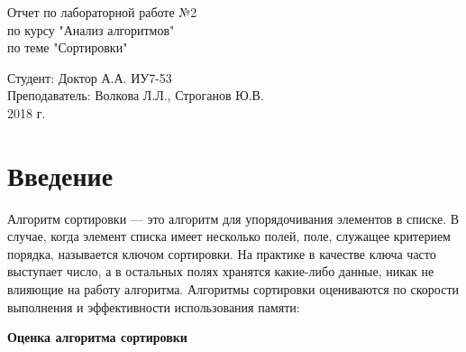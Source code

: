 \documentclass[a4paper, 14pt]{article}
\begin{document}
	\begin{titlepage}
		\begin{center}
			\begin{LARGE}
				Отчет по лабораторной работе №2\\
					по курсу "Анализ алгоритмов"\\
					по теме "Сортировки"
			\end{LARGE}
		
			\begin{Large}
				\vspace{10cm}
				Студент: Доктор А.А. ИУ7-53\\
					Преподаватель: Волкова Л.Л.,
								   Строганов Ю.В.\\
				
				\vspace{5cm}2018 г.				   
			\end{Large}
			
		\end{center}
		 
	\end{titlepage}

\tableofcontents
	
\newpage
\section*{Введение}
\hspace{1cm}Алгоритм сортировки — это алгоритм для упорядочивания элементов в списке. В случае, когда элемент списка имеет несколько полей, поле, служащее критерием порядка, называется ключом сортировки. На практике в качестве ключа часто выступает число, а в остальных полях хранятся какие-либо данные, никак не влияющие на работу алгоритма.
Алгоритмы сортировки оцениваются по скорости выполнения и эффективности использования памяти:

\begin{doublespace}
\large
\textbf{Оценка алгоритма сортировки}
\normalsize
\end{doublespace}
\end{document}
